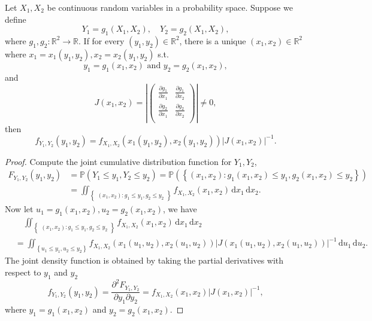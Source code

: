 Let \(X_1, X_2\) be continuous random variables in a probability space. Suppose we define 
\[
    Y_1 = g_1(X_1, X_2), \quad Y_2 = g_2(X_1, X_2),
\] 
where \(g_1, g_2: \mathbb{R} ^2 \to \mathbb{R}\). If for every \((y_1, y_2) \in \mathbb{R} ^2\), there is a unique \((x_1, x_2) \in \mathbb{R} ^2\) where \(x_1 = x_1(y_1, y_2), x_2 = x_2(y_1, y_2)\) s.t.
\[
    y_1 = g_1(x_1, x_2) \text{ and } y_2 = g_2(x_1, x_2), 
\]   
and 
\[
    J(x_1, x_2) = \left\vert \begin{pmatrix}
        \frac{\partial g_1}{\partial x_1}  & \frac{\partial g_1}{\partial x_2}   \\
         \frac{\partial g_2}{\partial x_1} & \frac{\partial g_2}{\partial x_2}   \\
    \end{pmatrix} \right\vert \neq 0,
\]
then 
\[
    f_{Y_1, Y_2}(y_1, y_2) = f_{X_1, X_2} \left( x_1 (y_1, y_2), x_2(y_1, y_2)\right) \left\vert J(x_1, x_2) \right\vert ^{-1}. 
\]
\begin{proof}
    Compute the joint cumulative distribution function for \(Y_1, Y_2\),
    \begin{align*}
        F_{Y_1, Y_2} (y_1, y_2) &= \mathbb{P} \left( Y_1 \le y_1, Y_2 \le y_2 \right) = \mathbb{P} \left( \left\{ (x_1, x_2): g_1(x_1, x_2) \le y_1, g_2(x_1, x_2) \le y_2 \right\}  \right) \\
        &= \iint_{\left\{ \substack{(x_1, x_2): g_1 \le y_1, g_2 \le y_2} \right\} } f_{X_1, X_2} (x_1, x_2) \, \mathrm{d} x_1 \, \mathrm{d} x_2.   
    \end{align*} 
    Now let \(u_1 = g_1(x_1, x_2), u_2 = g_2(x_1, x_2)\), we have 
    \begin{align*}
       &\quad \iint_{\left\{ \substack{(x_1, x_2): g_1 \le y_1, g_2 \le y_2} \right\} } f_{X_1, X_2} (x_1, x_2) \, \mathrm{d} x_1 \, \mathrm{d} x_2 \\
       &= \iint_{\left\{ u_1 \le y_1, u_2 \le y_2 \right\} } f_{X_1, X_2} \left( x_1(u_1, u_2), x_2(u_1, u_2) \right) \left\vert J(x_1(u_1, u_2), x_2(u_1, u_2)) \right\vert^{-1} \, \mathrm{d} u_1 \, \mathrm{d} u_2.     
    \end{align*} 
    The joint density function is obtained by taking the partial derivatives with respect to $y_1$ and $y_2$
    \[
        f_{Y_1, Y_2} (y_1, y_2) = \frac{\partial^2 F_{Y_1, Y_2}}{\partial y_1 \partial y_2} = f_{X_1, X_2} (x_1, x_2) \vert J(x_1, x_2) \vert^{-1},  
    \] 
    where \(y_1 = g_1(x_1, x_2)\) and \(y_2 = g_2(x_1, x_2)\).  
\end{proof}


